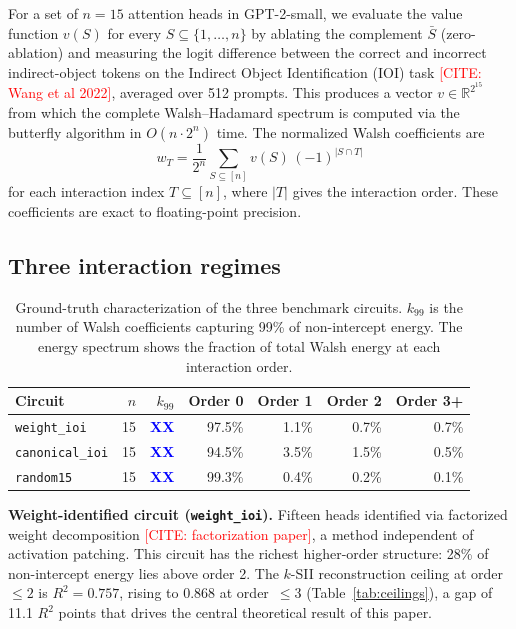 \documentclass[11pt]{article}
\newcommand{\citeneeded}[1]{\textcolor{red}{[CITE: #1]}}
\newcommand{\numplaceholder}[1]{\textcolor{blue}{\textbf{#1}}}
\begin{document}
For a set of $n = 15$ attention heads in GPT-2-small, we evaluate
the value function $v(S)$ for every $S \subseteq \{1, \ldots, n\}$
by ablating the complement $\bar{S}$ (zero-ablation) and measuring
the logit difference between the correct and incorrect indirect-object
tokens on the Indirect Object Identification (IOI) task
\citeneeded{Wang et al 2022}, averaged over 512 prompts. This
produces a vector $v \in \mathbb{R}^{2^{15}}$ from which the
complete Walsh--Hadamard spectrum is computed via the butterfly
algorithm in $O(n \cdot 2^n)$ time. The normalized Walsh coefficients
are
\[
  w_T = \frac{1}{2^n} \sum_{S \subseteq [n]} v(S) \,(-1)^{|S \cap T|}
\]
for each interaction index $T \subseteq [n]$, where $|T|$ gives the
interaction order. These coefficients are exact to floating-point
precision.

\subsection{Three interaction regimes}

\begin{table}[t]
\centering
\caption{Ground-truth characterization of the three benchmark circuits.
$k_{99}$ is the number of Walsh coefficients capturing 99\% of
non-intercept energy. The energy spectrum shows the fraction of total
Walsh energy at each interaction order.}
\label{tab:circuits}
\begin{tabular}{lrrrrrr}
\toprule
Circuit & $n$ & $k_{99}$ & Order 0 & Order 1 & Order 2 & Order 3+ \\
\midrule
\texttt{weight\_ioi} & 15 & \numplaceholder{XX} & 97.5\% & 1.1\% & 0.7\% & 0.7\% \\
\texttt{canonical\_ioi} & 15 & \numplaceholder{XX} & 94.5\% & 3.5\% & 1.5\% & 0.5\% \\
\texttt{random15} & 15 & \numplaceholder{XX} & 99.3\% & 0.4\% & 0.2\% & 0.1\% \\
\bottomrule
\end{tabular}
\end{table}

\textbf{Weight-identified circuit (\texttt{weight\_ioi}).}
Fifteen heads identified via factorized weight decomposition
\citeneeded{factorization paper}, a method independent of activation
patching. This circuit has the richest higher-order structure: 28\% of
non-intercept energy lies above order 2. The $k$-SII reconstruction
ceiling at order~$\leq 2$ is $R^2 = 0.757$, rising to $0.868$ at
order~$\leq 3$ (Table~\ref{tab:ceilings}), a gap of 11.1 $R^2$
points that drives the central theoretical result of this paper.
\end{document}
